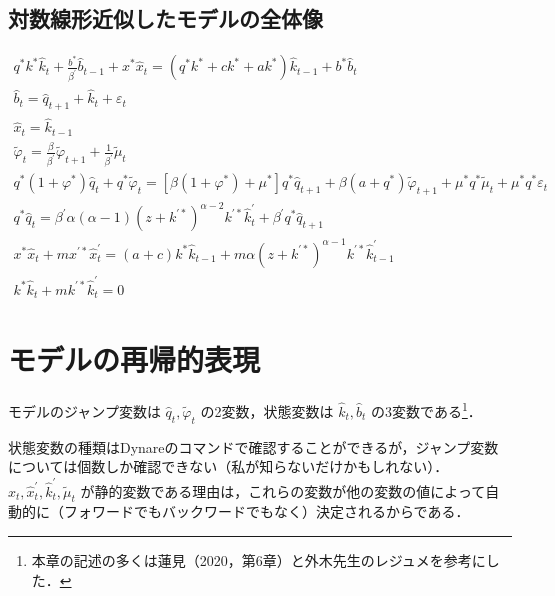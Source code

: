 \documentclass[dvipdfmx]{jlreq}
\begin{document}
\subsection*{対数線形近似したモデルの全体像}
\begin{gather}
  q^* k^* \widehat{k}_t + \frac{b^*}{\beta^\prime} \widehat{b}_{t-1} + x^* \widehat{x}_t = (q^* k^* + c k^* + a k^*) \widehat{k}_{t-1} + b^* \widehat{b}_t \\
  \widehat{b}_t = \widehat{q}_{t+1} + \widehat{k}_t + \varepsilon_t \\
  \widehat{x}_t = \widehat{k}_{t-1} \\
  \widetilde{\varphi}_t = \frac{\beta}{\beta^\prime} \widetilde{\varphi}_{t+1} + \frac{1}{\beta^\prime} \widetilde{\mu}_t \\
  q^*(1+\varphi^*) \widehat{q}_t + q^* \widetilde{\varphi}_t = [\beta(1+\varphi^*) + \mu^*] q^* \widehat{q}_{t+1} + \beta(a+q^*) \widetilde{\varphi}_{t+1} + \mu^* q^* \widetilde{\mu}_t + \mu^* q^* \varepsilon_t \\
  q^* \widehat{q}_t = \beta^\prime \alpha(\alpha-1)(z+k^{\prime *})^{\alpha-2} k^{\prime *} \widehat{k}^\prime_t + \beta^\prime q^* \widehat{q}_{t+1} \\
  x^* \widehat{x}_t + m x^{\prime *} \widehat{x}^\prime_t = (a+c)k^* \widehat{k}_{t-1} + m \alpha(z+k^{\prime *})^{\alpha-1} k^{\prime *} \widehat{k}^\prime_{t-1} \\
  k^* \widehat{k}_t + m k^{\prime *} \widehat{k}^\prime_t = 0
\end{gather}

\section{モデルの再帰的表現}
モデルのジャンプ変数は $\widehat{q}_t, \widetilde{\varphi}_t$ の2変数，状態変数は $\widehat{k}_t, \widehat{b}_t$ の3変数である\footnote{本章の記述の多くは蓮見（2020，第6章）と外木先生のレジュメを参考にした．}．

状態変数の種類はDynareのコマンドで確認することができるが，ジャンプ変数については個数しか確認できない（私が知らないだけかもしれない）．
$\widehat{x}_t, \widehat{x}^\prime_t, \widehat{k}_t^\prime, \widetilde{\mu}_t$ が静的変数である理由は，これらの変数が他の変数の値によって自動的に（フォワードでもバックワードでもなく）決定されるからである．
\end{document}
